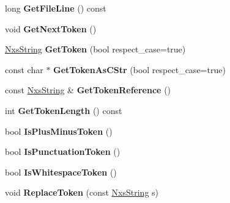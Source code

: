 \begin{DoxyCompactItemize}
\item 
\hypertarget{classNxsToken_ae0fb11bf350d907295447864afa714ec}{
long {\bfseries GetFileLine} () const }
\label{classNxsToken_ae0fb11bf350d907295447864afa714ec}

\item 
\hypertarget{classNxsToken_a3346e398b3f6b5e8c7c3cebc49ae1c4b}{
void {\bfseries GetNextToken} ()}
\label{classNxsToken_a3346e398b3f6b5e8c7c3cebc49ae1c4b}

\item 
\hypertarget{classNxsToken_a83d7b2a9a2307a0aee8476b904c8145f}{
\hyperlink{classNxsString}{NxsString} {\bfseries GetToken} (bool respect\_\-case=true)}
\label{classNxsToken_a83d7b2a9a2307a0aee8476b904c8145f}

\item 
\hypertarget{classNxsToken_abb9c1599e43267a342fb72be7b878541}{
const char $\ast$ {\bfseries GetTokenAsCStr} (bool respect\_\-case=true)}
\label{classNxsToken_abb9c1599e43267a342fb72be7b878541}

\item 
\hypertarget{classNxsToken_aba7767f4b14936fa7061b77cf2f9e543}{
const \hyperlink{classNxsString}{NxsString} \& {\bfseries GetTokenReference} ()}
\label{classNxsToken_aba7767f4b14936fa7061b77cf2f9e543}

\item 
\hypertarget{classNxsToken_a8231aba780039e4ef1fe2fbf24e21dba}{
int {\bfseries GetTokenLength} () const }
\label{classNxsToken_a8231aba780039e4ef1fe2fbf24e21dba}

\item 
\hypertarget{classNxsToken_af75d27ce09e09c66c838ad61e13839f7}{
bool {\bfseries IsPlusMinusToken} ()}
\label{classNxsToken_af75d27ce09e09c66c838ad61e13839f7}

\item 
\hypertarget{classNxsToken_a0e5bcf6a302bf475420b28036a218b51}{
bool {\bfseries IsPunctuationToken} ()}
\label{classNxsToken_a0e5bcf6a302bf475420b28036a218b51}

\item 
\hypertarget{classNxsToken_ada43d5e71e16665d7f20874bd6fb6641}{
bool {\bfseries IsWhitespaceToken} ()}
\label{classNxsToken_ada43d5e71e16665d7f20874bd6fb6641}

\item 
\hypertarget{classNxsToken_ac77db1862982198172efd9bc908d8e38}{
void {\bfseries ReplaceToken} (const \hyperlink{classNxsString}{NxsString} s)}
\label{classNxsToken_ac77db1862982198172efd9bc908d8e38}


\end{DoxyCompactItemize}
